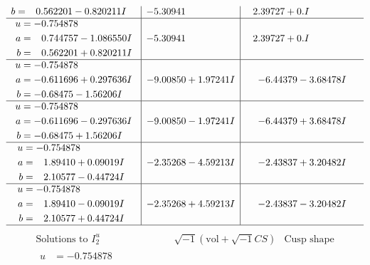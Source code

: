 \documentclass[1p]{elsarticle_modified}
\theoremstyle{definition}
\newcommand{\I}{\sqrt{-1}}
\begin{document}
$$\begin{array}{c|c|c}
\begin{aligned}
b &= \phantom{-}0.562201 - 0.820211 I\end{aligned}
 & -5.30941\phantom{ +0.000000I} & \phantom{-}2.39727 + 0. I\phantom{ +0.000000I} \\ \hline\begin{aligned}
u &= -0.754878\phantom{ +0.000000I} \\
a &= \phantom{-}0.744757 - 1.086550 I \\
b &= \phantom{-}0.562201 + 0.820211 I\end{aligned}
 & -5.30941\phantom{ +0.000000I} & \phantom{-}2.39727 + 0. I\phantom{ +0.000000I} \\ \hline\begin{aligned}
u &= -0.754878\phantom{ +0.000000I} \\
a &= -0.611696 + 0.297636 I \\
b &= -0.68475 - 1.56206 I\end{aligned}
 & -9.00850 + 1.97241 I & -6.44379 - 3.68478 I \\ \hline\begin{aligned}
u &= -0.754878\phantom{ +0.000000I} \\
a &= -0.611696 - 0.297636 I \\
b &= -0.68475 + 1.56206 I\end{aligned}
 & -9.00850 - 1.97241 I & -6.44379 + 3.68478 I \\ \hline\begin{aligned}
u &= -0.754878\phantom{ +0.000000I} \\
a &= \phantom{-}1.89410 + 0.09019 I \\
b &= \phantom{-}2.10577 - 0.44724 I\end{aligned}
 & -2.35268 - 4.59213 I & -2.43837 + 3.20482 I \\ \hline\begin{aligned}
u &= -0.754878\phantom{ +0.000000I} \\
a &= \phantom{-}1.89410 - 0.09019 I \\
b &= \phantom{-}2.10577 + 0.44724 I\end{aligned}
 & -2.35268 + 4.59213 I & -2.43837 - 3.20482 I\\
 \hline 
 \end{array}$$\newpage$$\begin{array}{c|c|c}  
\text{Solutions to }I^u_{2}& \I (\text{vol} + \sqrt{-1}CS) & \text{Cusp shape}\\
 \hline 
\begin{aligned}
u &= -0.754878\phantom{ +0.000000I} \\

\end{aligned}
\end{array}$$
\end{document}
